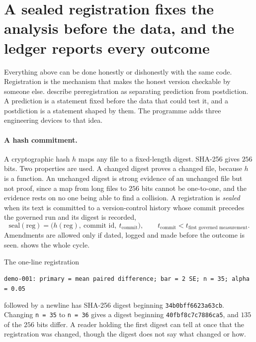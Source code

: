 
\section{A sealed registration fixes the analysis before the data, and the ledger reports every outcome}\label{sec:ch09:seal}

Everything above can be done honestly or dishonestly with the same code. Registration is the mechanism that makes the honest version checkable by someone else. \citet{nosek2018} describe preregistration as separating prediction from postdiction. A prediction is a statement fixed before the data that could test it, and a postdiction is a statement shaped by them. The programme adds three engineering devices to that idea.

\paragraph{A hash commitment.} A cryptographic hash $h$ maps any file to a fixed-length digest. SHA-256 gives $256$ bits. Two properties are used. A changed digest proves a changed file, because $h$ is a function. An unchanged digest is strong evidence of an unchanged file but not proof, since a map from long files to $256$ bits cannot be one-to-one, and the evidence rests on no one being able to find a collision. A registration is \emph{sealed} when its text is committed to a version-control history whose commit precedes the governed run and its digest is recorded,
\begin{equation}
\text{seal}(\text{reg})=\big(h(\text{reg}),\ \text{commit id},\ t_{\text{commit}}\big),\qquad t_{\text{commit}}<t_{\text{first governed measurement}}.
\label{eq:ch09:seal}
\end{equation}
Amendments are allowed only if dated, logged and made before the outcome is seen.  shows the whole cycle.

\begin{example}\label{ex:ch09:hash}
The one-line registration
\begin{center}
\texttt{demo-001: primary = mean paired difference; bar = 2 SE; n = 35; alpha = 0.05}
\end{center}
followed by a newline has SHA-256 digest beginning \texttt{34b0bff6623a63cb}. Changing \texttt{n = 35} to \texttt{n = 36} gives a digest beginning \texttt{40fbf8c7c7886ca5}, and $135$ of the $256$ bits differ. A reader holding the first digest can tell at once that the registration was changed, though the digest does not say what changed or how.
\end{example}

